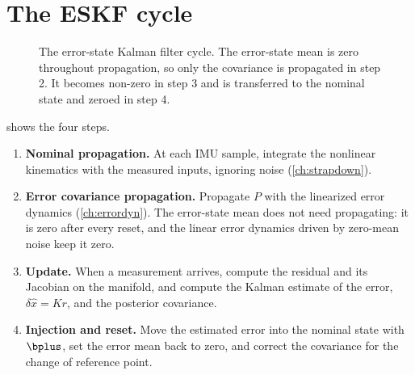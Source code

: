 \section{The ESKF cycle}

\begin{figure}[t]
\centering
{}
\caption{The error-state Kalman filter cycle. The error-state mean is zero throughout propagation, so only
the covariance is propagated in step 2. It becomes non-zero in step 3 and is transferred to the nominal
state and zeroed in step 4.}
\label{fig:eskf-cycle}
\end{figure}

 shows the four steps.
\begin{enumerate}
  \item \textbf{Nominal propagation.} At each IMU sample, integrate the nonlinear kinematics with the
        measured inputs, ignoring noise (\cref{ch:strapdown}).
  \item \textbf{Error covariance propagation.} Propagate $P$ with the linearized error dynamics
        (\cref{ch:errordyn}). The error-state mean does not need propagating: it is zero after every reset,
        and the linear error dynamics driven by zero-mean noise keep it zero.
  \item \textbf{Update.} When a measurement arrives, compute the residual and its Jacobian on the manifold,
        and compute the Kalman estimate of the error, $\delta\hat x = Kr$, and the posterior covariance.
  \item \textbf{Injection and reset.} Move the estimated error into the nominal state with $\bplus$, set the
        error mean back to zero, and correct the covariance for the change of reference point.
\end{enumerate}

